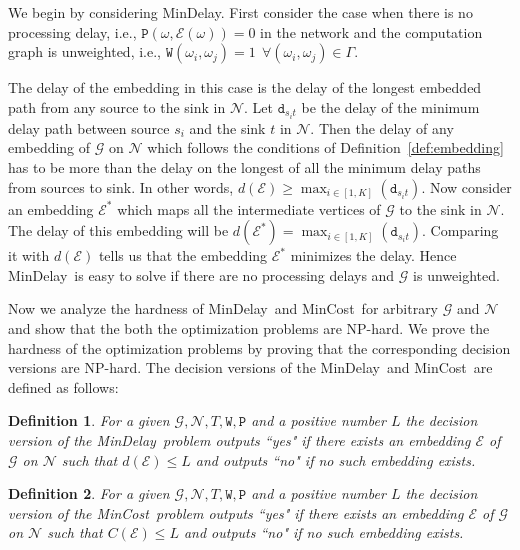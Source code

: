 \documentclass[journal]{IEEEtran}
\newtheorem{definition}{{\bf Definition}}
\newcommand{\net}{\mathcal{N}}
\newcommand{\compgraph}{\mathcal{G}}
\newcommand{\compedges}{\Gamma}
\newcommand{\distance}{\mathtt{d}} \newcommand{\edgewt}{\mathtt{W}} \newcommand{\processingwt}{\mathtt{P}}
\newcommand{\mincost}{\textsf{MinCost}}
\newcommand{\mindelay}{\textsf{MinDelay}}
\newcommand{\embedding}{\mathcal{E}}
\begin{document}
We begin by considering \mindelay. First consider the case when there
is no processing delay, i.e.,
$\processingwt(\omega,\embedding(\omega)) = 0$ in the network and the
computation graph is unweighted, i.e., $\edgewt(\omega_i,\omega_j) =1
\ \ \forall (\omega_i,\omega_j) \in \compedges.$
 
The delay of the embedding in this case is the delay of the longest
embedded path from any source to the sink in $\net.$ Let
$\distance_{s_it}$ be the delay of the minimum delay path between
source $s_i$ and the sink $t$ in $\net.$ Then the delay of any
embedding of $\compgraph$ on $\net$ which follows the conditions of
Definition~\ref{def:embedding} has to be more than the delay on the
longest of all the minimum delay paths from sources to sink. In other
words, $d(\embedding) \geq \max_{i \in [1,K]} (\distance_{s_it}).$
Now consider an embedding $\embedding^{*}$ which maps all the
intermediate vertices of $\compgraph$ to the sink in $\net.$ The delay
of this embedding will be $d(\embedding^{*}) = \max_{i \in [1,K]} (\distance_{s_it}).$
Comparing it with $d(\embedding)$ tells us that the embedding
$\embedding^{*}$ minimizes the delay. Hence \mindelay\ is easy to
solve if there are no processing delays and $\compgraph$ is
unweighted.

Now we analyze the hardness of \mindelay\ and \mincost\ for arbitrary
$\compgraph$ and $\net$ and show that the both the optimization
problems are NP-hard. We prove the hardness of the optimization
problems by proving that the corresponding decision versions are
NP-hard. The decision versions of the \mindelay\ and \mincost\ are
defined as follows:

\begin{definition}
  For a given $\compgraph,\net,T,\edgewt,\processingwt$ and a positive
  number $L$ the decision version of the \mindelay\ problem outputs
  \textit{``yes"} if there exists an embedding $\embedding$ of
  $\compgraph$ on $\net$ such that $d(\embedding) \leq L$ and outputs
  \textit{``no"} if no such embedding exists.
\end{definition}

\begin{definition} 
  For a given $\compgraph,\net,T,\edgewt,\processingwt$ and a positive
  number $L$ the decision version of the \mincost\ problem outputs
  \textit{``yes"} if there exists an embedding $\embedding$ of
  $\compgraph$ on $\net$ such that $C(\embedding) \leq L$ and outputs
  \textit{``no"} if no such embedding exists.
\end{definition}
\end{document}
